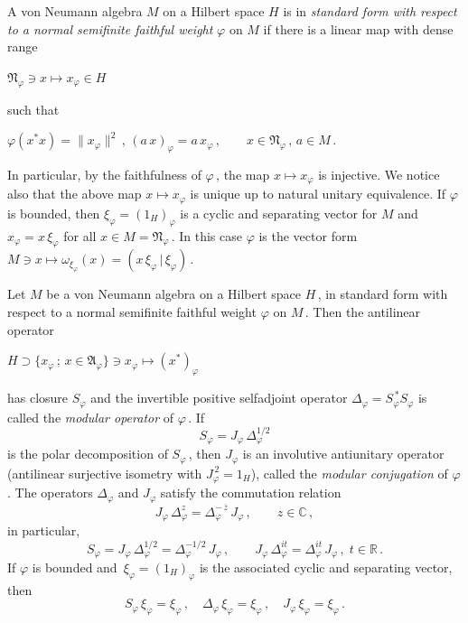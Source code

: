 \documentclass[reqno]{amsart}
\theoremstyle{definition}
\theoremstyle{remark}
\numberwithin{equation}{section}
\theoremstyle{plain}
\begin{document}
A von Neumann algebra $M$ on a Hilbert space $H$ is in \emph{standard
form with respect to a normal semifinite faithful weight} $\varphi$
on $M$ if there is a linear map with dense range
\begin{center}
$\mathfrak N_\varphi\ni x\longmapsto x_\varphi\in H$
\end{center}
such that
\begin{center}
$\varphi (x^*x)=\| x_\varphi\|^2\, ,\, (a\, x)_\varphi =a\, x_\varphi
\, ,\qquad x\in \mathfrak N_\varphi\, ,\, a\in M\, .$
\end{center}
In particular, by the faithfulness of $\varphi\,$, the map
$x\longmapsto x_\varphi$ is injective. We notice also that the above
map $x\longmapsto x_\varphi$ is unique up to natural unitary
equivalence. If $\varphi$ is bounded, then $\xi_\varphi =(1_H)_\varphi$
is a cyclic and separating vector for $M$ and $x_\varphi =
x\,\xi_\varphi$ for all $x\in M=\mathfrak N_\varphi\,$. In this case
$\varphi$ is the vector form $M\ni x\longmapsto
\omega_{\xi_\varphi} (x)=
(x\,\xi_\varphi\, |\,\xi_\varphi )\,$.

Let $M$ be a von Neumann algebra on a Hilbert space $H\,$, in
standard form with respect to a normal semifinite faithful weight
$\varphi$ on $M\,$. Then the antilinear operator
\begin{center}
$H\supset \{ x_\varphi\, ;\, x\in \mathfrak A_\varphi\}\ni x_\varphi
\longmapsto (x^*)_\varphi$
\end{center}
has closure $S_\varphi$ and the invertible positive selfadjoint
operator $\Delta_\varphi =S_\varphi^{\, *}S_\varphi$ is called the
\emph{modular operator} of $\varphi\,$. If
\begin{equation*}
S_\varphi =J_\varphi\,\Delta_\varphi^{1/2}
\end{equation*}
is the polar decomposition of $S_\varphi\,$, then $J_\varphi$
is an involutive antiunitary operator (antilinear surjective isometry
with $J_\varphi^{\, 2}=1_H$), called the \emph{modular conjugation} of
$\varphi\,$. The operators $\Delta_\varphi$ and $J_\varphi$ satisfy
the commutation relation
\begin{equation}\label{mod.comm}
J_\varphi\,\Delta_\varphi^z =\Delta_\varphi^{-\,\overline z}\,
J_\varphi\, ,\qquad z\in\mathbb C\, ,
\end{equation}
in particular,
\begin{equation}\label{mod.comm-}
S_\varphi =J_\varphi\,\Delta_\varphi^{1/2} =\Delta_\varphi^{-1/2}\,
J_\varphi\, ,\qquad J_\varphi\,\Delta_\varphi^{it}=
\Delta_\varphi^{it}\,J_\varphi\, ,\; t\in\mathbb R\, .
\end{equation}
If $\varphi$ is bounded and $\,\xi_\varphi =(1_H)_\varphi$ is the
associated cyclic and separating vector, then
\begin{equation*}
S_\varphi\,\xi_\varphi =\xi_\varphi\, ,\quad
\Delta_\varphi\,\xi_\varphi =\xi_\varphi\, ,\quad
J_\varphi\,\xi_\varphi =\xi_\varphi\, .
\end{equation*}
\end{document}
